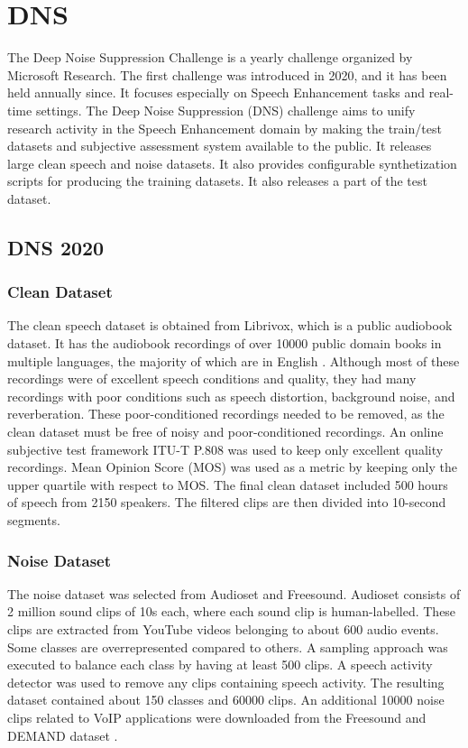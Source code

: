 \section{DNS \cite{reddy2020,dubey2022,dubey2023}}
The Deep Noise Suppression Challenge is a yearly challenge organized by Microsoft Research. The first challenge was introduced in 2020, and it has been held annually since. It focuses especially on Speech Enhancement tasks and real-time settings. The Deep Noise Suppression (DNS) challenge aims to unify research activity in the Speech Enhancement domain by making the train/test datasets and subjective assessment system available to the public. It releases large clean speech and noise datasets. It also provides configurable synthetization scripts for producing the training datasets. It also releases a part of the test dataset.

\subsection{DNS 2020 \cite{reddy2020}}
\subsubsection{Clean Dataset}
The clean speech dataset is obtained from Librivox, which is a public audiobook dataset. It has the audiobook recordings of over 10000 public domain books in multiple languages, the majority of which are in English \cite{panayotov2015}. Although most of these recordings were of excellent speech conditions and quality, they had many recordings with poor conditions such as speech distortion, background noise, and reverberation. These poor-conditioned recordings needed to be removed, as the clean dataset must be free of noisy and poor-conditioned recordings. An online subjective test framework ITU-T P.808 was used to keep only excellent quality recordings. Mean Opinion Score (MOS) was used as a metric by keeping only the upper quartile with respect to MOS. The final clean dataset included 500 hours of speech from 2150 speakers. The filtered clips are then divided into 10-second segments.
\subsubsection{Noise Dataset}
The noise dataset was selected from Audioset \cite{gemmeke2017} and Freesound. Audioset consists of 2 million sound clips of 10s each, where each sound clip is human-labelled. These clips are extracted from YouTube videos belonging to about 600 audio events. Some classes are overrepresented compared to others. A sampling approach was executed to balance each class by having at least 500 clips. A speech activity detector was used to remove any clips containing speech activity. The resulting dataset contained about 150 classes and 60000 clips. An additional 10000 noise clips related to VoIP applications were downloaded from the Freesound and DEMAND dataset \cite{thiemann2013}.
